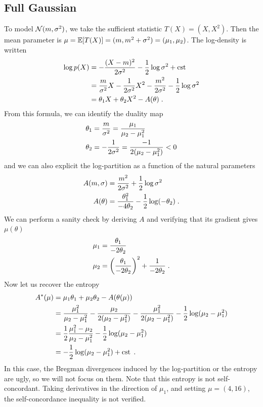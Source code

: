 \documentclass{article}
\newcommand{\logpart}{A}
\newcommand{\conj}{\logpart^*}
\newcommand{\natp}{\theta}
\begin{document}
\subsection{Full Gaussian}
To model ${\mathcal N}(m,\sigma^2)$, we take the sufficient statistic $T(X) = (X, X^2)$. Then the mean parameter is $\mu = \operatorname{\mathbb{E}}[T(X)] = ( m , m^2 + \sigma^2) = (\mu_1, \mu_2) $.
The log-density is written
\begin{align}
	\log p(X) 
	&= -\frac{(X-m)^2}{2 \sigma^2} - \half \log \sigma^2 + \cst \\
	&=  \frac{m}{\sigma^2} X -\inv{2 \sigma^2} X^2 - \frac{m^2}{2 \sigma^2} - \half \log \sigma^2 \\
	&=  \natp_1 X + \natp_2 X^2  - \logpart(\natp) \; .
\end{align}
From this formula, we can identify the duality map
\begin{align}
	\natp_1 &= \frac{m}{\sigma^2} = \frac{\mu_1}{\mu_2 - \mu_1^2} \\
	\natp_2 &= -\inv{2 \sigma^2} =  \frac{ - 1}{2(\mu_2 - \mu_1^2)}  < 0
\end{align}
and we can also explicit the log-partition as a function of the natural parameters
\begin{align}
	\logpart(m, \sigma) &= \frac{m^2}{2 \sigma^2} + \half \log \sigma^2 \\
	\logpart(\natp) &= \frac{\natp_1^2}{-4\natp_2} - \half \log(-\natp_2) \; .
\end{align}
We can perform a sanity check by deriving $\logpart$ and verifying that its gradient gives $\mu(\natp)$
\begin{align}
	\mu_1 &= \frac{\natp_1}{-2\natp_2}  \\
	\mu_2 & = \left( \frac{\natp_1}{-2\natp_2} \right)^2 + \inv{-2 \natp_2} \; .
\end{align}
Now let us recover the entropy
\begin{align}
	\conj (\mu) &= \mu_1 \natp_1 + \mu_2 \natp_2  - \logpart(\natp(\mu)) \\
	& = \frac{\mu_1^2}{\mu_2 - \mu_1^2}  - \frac{\mu_2}{2(\mu_2 - \mu_1^2)} - \frac{\mu_1^2}{2(\mu_2 - \mu_1^2)}  - \half \log(\mu_2 - \mu_1^2) \\
	&= \half \frac{\mu_1^2 - \mu_2}{\mu_2 - \mu_1^2} - \half \log(\mu_2 - \mu_1^2) \\
	& = - \half \log (\mu_2 - \mu_1^2) + \cst \; .
\end{align}
In this case, the Bregman divergences induced by the log-partition or the entropy are ugly, so we will not focus on them.
Note that this entropy is not self-concordant. Taking derivatives in the direction of $\mu_1$, and setting $\mu = (4, 16)$,  the self-concordance inequality is not verified.
\end{document}
